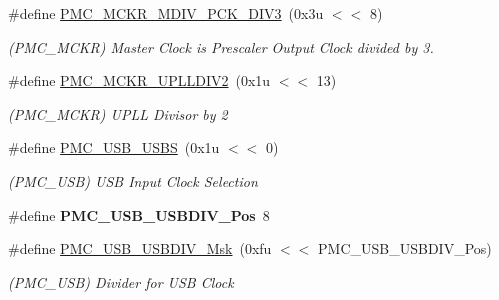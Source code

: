 \begin{DoxyCompactItemize}
\mbox{\label{group__SAMV71__PMC_ga146ebfb5b80c79b85bb42a912d95801f}} 
\#define \mbox{\hyperlink{group__SAMV71__PMC_ga146ebfb5b80c79b85bb42a912d95801f}{P\+M\+C\+\_\+\+M\+C\+K\+R\+\_\+\+M\+D\+I\+V\+\_\+\+P\+C\+K\+\_\+\+D\+I\+V3}}~(0x3u $<$$<$ 8)
\begin{DoxyCompactList}\small\item\em (P\+M\+C\+\_\+\+M\+C\+KR) Master Clock is Prescaler Output Clock divided by 3. \end{DoxyCompactList}\item 
\mbox{\label{group__SAMV71__PMC_ga81cf9541c8611091050ddd024ef47e62}} 
\#define \mbox{\hyperlink{group__SAMV71__PMC_ga81cf9541c8611091050ddd024ef47e62}{P\+M\+C\+\_\+\+M\+C\+K\+R\+\_\+\+U\+P\+L\+L\+D\+I\+V2}}~(0x1u $<$$<$ 13)
\begin{DoxyCompactList}\small\item\em (P\+M\+C\+\_\+\+M\+C\+KR) U\+P\+LL Divisor by 2 \end{DoxyCompactList}\item 
\mbox{\label{group__SAMV71__PMC_ga0c8663e766b5d400fbd2e36964217aba}} 
\#define \mbox{\hyperlink{group__SAMV71__PMC_ga0c8663e766b5d400fbd2e36964217aba}{P\+M\+C\+\_\+\+U\+S\+B\+\_\+\+U\+S\+BS}}~(0x1u $<$$<$ 0)
\begin{DoxyCompactList}\small\item\em (P\+M\+C\+\_\+\+U\+SB) U\+SB Input Clock Selection \end{DoxyCompactList}\item 
\mbox{\label{group__SAMV71__PMC_gaa1bfcde618f6dc70280dfadd16dd7254}} 
\#define {\bfseries P\+M\+C\+\_\+\+U\+S\+B\+\_\+\+U\+S\+B\+D\+I\+V\+\_\+\+Pos}~8
\item 
\mbox{\label{group__SAMV71__PMC_gabb062c3f15ab096e8ea86a30d4ba7293}} 
\#define \mbox{\hyperlink{group__SAMV71__PMC_gabb062c3f15ab096e8ea86a30d4ba7293}{P\+M\+C\+\_\+\+U\+S\+B\+\_\+\+U\+S\+B\+D\+I\+V\+\_\+\+Msk}}~(0xfu $<$$<$ P\+M\+C\+\_\+\+U\+S\+B\+\_\+\+U\+S\+B\+D\+I\+V\+\_\+\+Pos)
\begin{DoxyCompactList}\small\item\em (P\+M\+C\+\_\+\+U\+SB) Divider for U\+SB Clock \end{DoxyCompactList}\item 

\end{DoxyCompactItemize}

